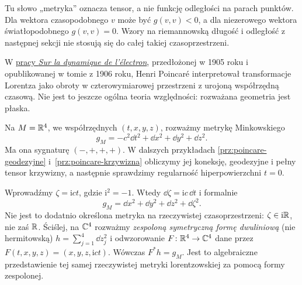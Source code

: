 Tu słowo „metryka” oznacza tensor, a nie funkcję
odległości na parach punktów. Dla wektora
czasopodobnego $v$ może być $g(v,v)<0$, a dla
niezerowego wektora światłopodobnego $g(v,v)=0$.
Wzory na riemannowską długość i odległość
z następnej sekcji nie stosują się do całej
takiej czasoprzestrzeni.

\begin{przyklad}
\label{prz:poincare-czas-urojony}
W \href{https://fr.wikisource.org/wiki/Sur_la_dynamique_de_l\%E2\%80\%99\%C3\%A9lectron}
{pracy \emph{Sur la dynamique de l'électron}}, przedłożonej
w 1905 roku i opublikowanej w tomie z 1906 roku, Henri Poincaré
interpretował transformacje Lorentza jako obroty
w czterowymiarowej przestrzeni z urojoną współrzędną
czasową. Nie jest to jeszcze ogólna teoria względności:
rozważana geometria jest płaska.

Na $M=\mathbb{R}^4$, we współrzędnych $(t,x,y,z)$, rozważmy
metrykę Minkowskiego
\begin{equation}\label{eq:poincare-minkowski}
 g_M=-c^2\dd t^2+\dd x^2+\dd y^2+\dd z^2.
\end{equation}
Ma ona sygnaturę $(-,+,+,+)$. W dalszych przykładach
\ref{prz:poincare-geodezyjne} i~\ref{prz:poincare-krzywizna}
obliczymy jej koneksję, geodezyjne i pełny tensor
krzywizny, a następnie sprawdzimy regularność
hiperpowierzchni $t=0$.

Wprowadźmy $\zeta=\mathrm{i}ct$, gdzie $\mathrm{i}^2=-1$.
Wtedy $\dd\zeta=\mathrm{i}c\,\dd t$ i formalnie
\begin{equation}\label{eq:poincare-complex-metric}
 g_M=\dd x^2+\dd y^2+\dd z^2+\dd\zeta^2.
\end{equation}
Nie jest to dodatnio określona metryka na rzeczywistej
czasoprzestrzeni: $\zeta\in\mathrm{i}\mathbb{R}$, nie zaś
$\mathbb{R}$. Ściślej, na $\mathbb{C}^4$ rozważmy \emph{zespoloną
symetryczną formę dwuliniową} (nie hermitowską)
$h=\sum_{j=1}^4\dd z_j^2$ i odwzorowanie
$F\colon\mathbb{R}^4\to\mathbb{C}^4$ dane przez
$F(t,x,y,z)=(x,y,z,\mathrm{i}ct)$.
Wówczas $F^*h=g_M$. Jest to algebraiczne
przedstawienie tej samej rzeczywistej metryki
lorentzowskiej za pomocą formy zespolonej.


\end{przyklad}
